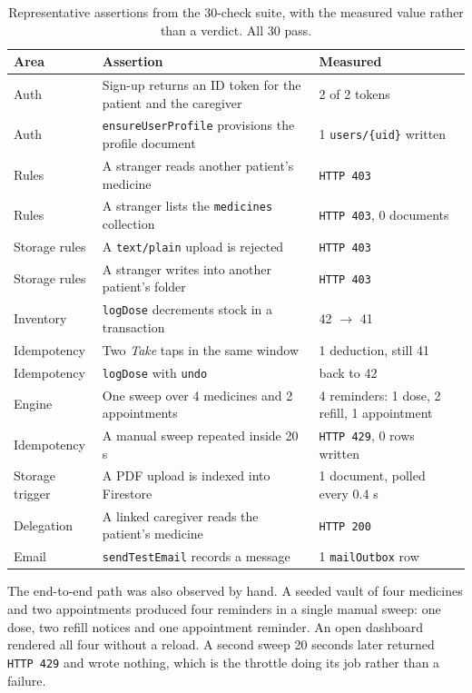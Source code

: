 \documentclass[11pt,a4paper]{report}
\begin{document}
\begin{table}[h]
\centering
\caption{Representative assertions from the 30-check suite, with the measured value rather than a
verdict. All 30 pass.}
\label{tab:assertions}
\small
\begin{tabularx}{\textwidth}{@{}l X l@{}}
\toprule
\textbf{Area} & \textbf{Assertion} & \textbf{Measured} \\
\midrule
Auth & Sign-up returns an ID token for the patient and the caregiver & 2 of 2 tokens \\
Auth & \texttt{ensureUserProfile} provisions the profile document & 1 \texttt{users/\{uid\}} written \\
Rules & A stranger reads another patient's medicine & \texttt{HTTP 403} \\
Rules & A stranger lists the \texttt{medicines} collection & \texttt{HTTP 403}, 0 documents \\
Storage rules & A \texttt{text/plain} upload is rejected & \texttt{HTTP 403} \\
Storage rules & A stranger writes into another patient's folder & \texttt{HTTP 403} \\
Inventory & \texttt{logDose} decrements stock in a transaction & 42 $\rightarrow$ 41 \\
Idempotency & Two \emph{Take} taps in the same window & 1 deduction, still 41 \\
Idempotency & \texttt{logDose} with \texttt{undo} & back to 42 \\
Engine & One sweep over 4 medicines and 2 appointments & 4 reminders: 1 dose, 2 refill, 1 appointment \\
Idempotency & A manual sweep repeated inside 20 s & \texttt{HTTP 429}, 0 rows written \\
Storage trigger & A PDF upload is indexed into Firestore & 1 document, polled every 0.4 s \\
Delegation & A linked caregiver reads the patient's medicine & \texttt{HTTP 200} \\
Email & \texttt{sendTestEmail} records a message & 1 \texttt{mailOutbox} row \\
\bottomrule
\end{tabularx}
\end{table}

The end-to-end path was also observed by hand. A seeded vault of four medicines and two appointments
produced four reminders in a single manual sweep: one dose, two refill notices and one appointment
reminder. An open dashboard rendered all four without a reload. A second sweep 20 seconds later returned
\texttt{HTTP 429} and wrote nothing, which is the throttle doing its job rather than a failure.
\end{document}
